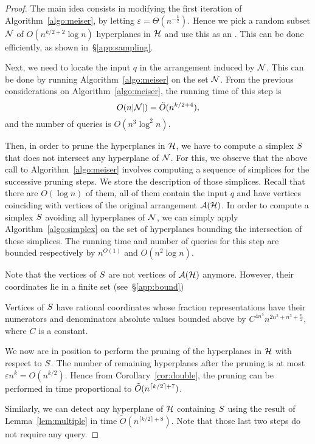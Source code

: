 \begin{proof}
The main idea consists in modifying the first iteration of Algorithm~\ref{algo:meiser}, by
letting $\varepsilon = \Theta(n^{-\frac{k}{2}})$.
Hence we pick a random subset $\mathcal{N}$ of
$O(n^{k/2 + 2} \log n)$ hyperplanes in $\mathcal{H}$ and use this as an \enet.
This can be done efficiently, as shown in~\S\ref{app:sampling}.

Next, we need to locate the input $q$ in the arrangement induced by
$\mathcal{N}$. This can be done by running Algorithm~\ref{algo:meiser} on the set
$\mathcal{N}$. From the previous considerations on Algorithm~\ref{algo:meiser}, the
running time of this step is
$$
O(n|\mathcal{N}|) = \tilde{O}(n^{k/2 + 4}),
$$
and the number of queries is $O(n^3\log^2 n)$.

Then, in order to prune the hyperplanes in $\mathcal{H}$, we have to
compute a simplex $S$ that does not intersect any hyperplane of
$\mathcal{N}$. For this, we observe that the above call to Algorithm~\ref{algo:meiser}
involves computing a sequence of simplices for the successive pruning
steps.
%
We store the description of those simplices. Recall that there are
$O(\log n)$ of them, all of them contain the input $q$ and have vertices
coinciding with vertices of the original arrangement $\mathcal{A}(\mathcal{H})$. In
order to compute a simplex $S$ avoiding all hyperplanes of
$\mathcal{N}$, we can simply apply Algorithm~\ref{algo:simplex} on the set of
hyperplanes bounding the intersection of these simplices. The running time
and number of queries for this step are bounded respectively by
$n^{O(1)}$ and $O(n^2\log n)$.

Note that the vertices of $S$ are not vertices
of $\mathcal{A}(\mathcal{H})$ anymore. However, their coordinates lie in a finite set
(see~\S\ref{app:bound})
\begin{lemma}\label{lem:bound}
Vertices of $S$ have rational coordinates whose fraction representations
have their numerators and denominators absolute values bounded above by
$C^{4n^5} n^{2n^5+n^3+\frac n2}$, where $C$ is a constant.
\end{lemma}

We now are in position to perform the pruning of the hyperplanes in $\mathcal{H}$ with
respect to $S$. The number of remaining hyperplanes after the pruning is
at most $\varepsilon n^k = O(n^{k/2})$. Hence from Corollary~\ref{cor:double}, the
pruning can be performed in time proportional to $\tilde{O}(n^{\lceil k/2\rceil + 7})$.

Similarly, we can detect any hyperplane of $\mathcal{H}$ containing $S$ using the
result of Lemma~\ref{lem:multiple} in time $\tilde{O}(n^{\lceil k/2\rceil +
8})$. Note that those last two steps do not require any query.


\end{proof}

